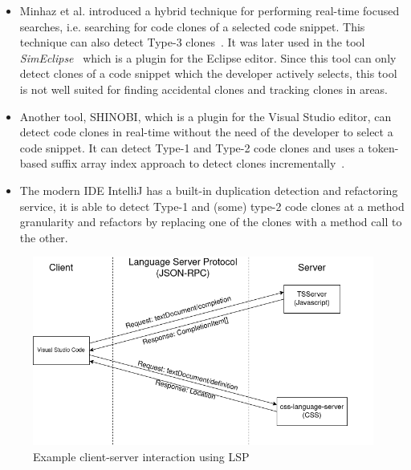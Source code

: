 \begin{itemize}

	\item Minhaz et al. introduced a hybrid technique for performing real-time focused
	      searches, i.e. searching for code clones of a selected code snippet. This
	      technique can also detect Type-3 clones~\cite{Zibran_real_time_search}. It was
	      later used in the tool
	      \textit{SimEclipse}~\cite{Udding_Towards_Convenient_Management} which is a plugin
	      for the Eclipse editor. Since this tool can only detect clones of a code snippet
	      which the developer actively selects, this tool is not well suited for finding
	      accidental clones and tracking clones in areas.

	\item Another tool, SHINOBI, which is a plugin for the Visual Studio editor, can
	      detect code clones in real-time without the need of the developer to select a code
	      snippet. It can detect Type-1 and Type-2 code clones and uses a token-based suffix
	      array index approach to detect clones incrementally~\cite{SHINOBI}.

	\item The modern IDE IntelliJ has a built-in duplication detection and refactoring
	      service, it is able to detect Type-1 and (some) type-2 code clones at a method
	      granularity and refactors by replacing one of the clones with a method call to the
	      other.

\end{itemize}

\begin{figure}[t]
	\includegraphics[width=\textwidth]{images/lspcommunication.png}
	\caption{Example client-server interaction using LSP}
	\label{fig:lspcommunication}
\end{figure}

